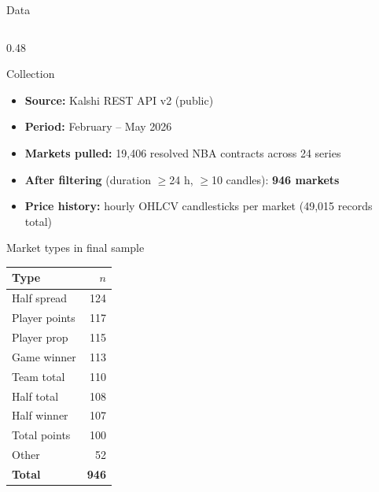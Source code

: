 \documentclass[10pt, aspectratio=169]{beamer}
\begin{document}
\begin{frame}{Data}
  \begin{columns}[T]
    \begin{column}{0.48\textwidth}
      \begin{block}{Collection}
        \begin{itemize}
          \item \textbf{Source:} Kalshi REST API v2 (public)
          \item \textbf{Period:} February -- May 2026
          \item \textbf{Markets pulled:} 19{,}406 resolved NBA contracts
                across 24 series
          \item \textbf{After filtering} (duration $\geq$24 h,
                $\geq$10 candles): \textbf{946 markets}
          \item \textbf{Price history:} hourly OHLCV candlesticks
                per market (49{,}015 records total)
        \end{itemize}
      \end{block}

      \medskip
      \begin{block}{Market types in final sample}
        \footnotesize
        \begin{tabular}{@{}lr@{}}
          \toprule
          Type & $n$ \\
          \midrule
          Half spread   & 124 \\
          Player points & 117 \\
          Player prop   & 115 \\
          Game winner   & 113 \\
          Team total    & 110 \\
          Half total    & 108 \\
          Half winner   & 107 \\
          Total points  & 100 \\
          Other         &  52 \\
          \bottomrule
          \textbf{Total} & \textbf{946} \\
        \end{tabular}
      \end{block}
    \end{column}


\end{columns}
\end{frame}
\end{document}
